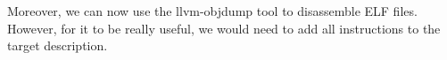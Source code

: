 Moreover, we can now use the llvm-objdump tool to disassemble ELF files. However, for it to be really useful, we would need to add all instructions to the target description.


























































